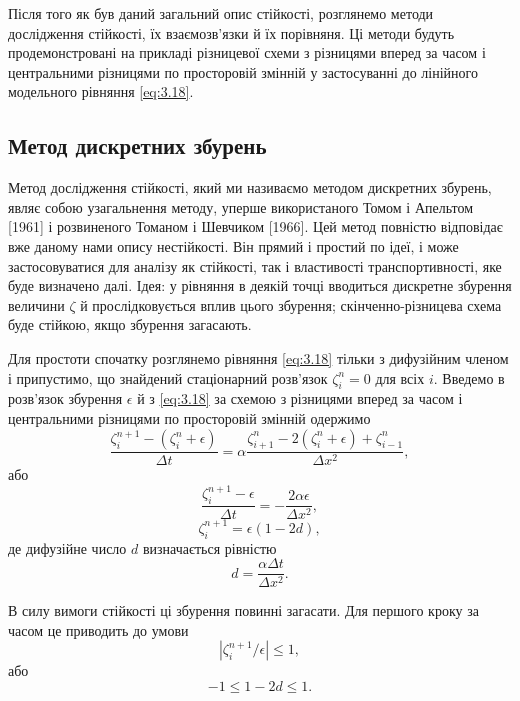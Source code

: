 Після того як був даний загальний опис стійкості, розглянемо методи дослідження стійкості, їх взаємозв'язки й їх порівняня. Ці методи будуть продемонстровані на прикладі різницевої схеми з різницями вперед за часом і центральними різницями по просторовій змінній у застосуванні до лінійного модельного рівняння \eqref{eq:3.18}.

\subsection{Метод дискретних збурень}

Метод дослідження стійкості, який ми називаємо методом дискретних збурень, являє собою узагальнення методу, уперше використаного Томом і Апельтом [1961] і розвиненого Томаном і Шевчиком [1966]. Цей метод повністю відповідає вже даному нами опису нестійкості. Він прямий і простий по ідеї, і може застосовуватися для аналізу як стійкості, так і властивості транспортивності, яке буде визначено далі. Ідея: у рівняння в деякій точці вводиться дискретне збурення величини $\zeta$ й прослідковується вплив цього збурення; скінченно-різницева схема буде стійкою, якщо збурення загасають. \medskip

Для простоти спочатку розглянемо рівняння \eqref{eq:3.18} тільки з дифузійним членом і припустимо, що знайдений стаціонарний розв'язок $\zeta_i^n = 0$ для всіх $i$. Введемо в розв'язок збурення $\epsilon$ й з \eqref{eq:3.18} за схемою з різницями вперед за часом і центральними різницями по просторовій змінній одержимо
\begin{equation}
    \label{eq:3.57}
    \frac{\zeta_i^{n + 1} - (\zeta_i^n + \epsilon)}{\Delta t} = \alpha \frac{\zeta_{i + 1}^n - 2(\zeta_i^n + \epsilon) + \zeta_{i - 1}^n}{\Delta x^2},
\end{equation}
або
\begin{equation}
    \label{eq:3.58}
    \frac{\zeta_i^{n + 1} - \epsilon}{\Delta t} = - \frac{2 \alpha \epsilon}{\Delta x^2},
\end{equation}
\begin{equation}
    \label{eq:3.59}
    \zeta_i^{n + 1} = \epsilon (1 - 2 d),
\end{equation}
де дифузійне число $d$ визначається рівністю
\begin{equation}
    \label{eq:3.60}
    d = \frac{\alpha \Delta t}{\Delta x^2}.
\end{equation}

В силу вимоги стійкості ці збурення повинні загасати. Для першого кроку за часом це приводить до умови
\begin{equation}
    \label{eq:3.61}
    |\zeta_i^{n + 1} / \epsilon | \le 1,
\end{equation}
або
\begin{equation}
    \label{eq:3.62}
    -1 \le 1 - 2 d \le 1.
\end{equation}

